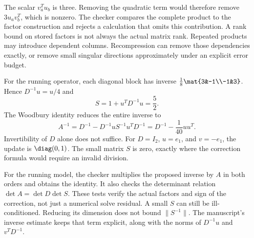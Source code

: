 The scalar $v_a^Tu_b$ is three. Removing the quadratic term would therefore remove $3u_av_b^T$, which is nonzero. The checker compares the complete product to the factor construction and rejects a calculation that omits this contribution.
A rank bound on stored factors is not always the actual matrix rank. Repeated products may introduce dependent columns. Recompression can remove those dependencies exactly, or remove small singular directions approximately under an explicit error budget.

For the running operator, each diagonal block has inverse $\frac18\mat{3&-1\\-1&3}$. Hence $D^{-1}u=u/4$ and
\[
S=1+u^TD^{-1}u=\frac52.
\]
The Woodbury identity reduces the entire inverse to
\[
A^{-1}=D^{-1}-D^{-1}uS^{-1}u^TD^{-1}
=D^{-1}-\frac1{40}uu^T.
\]
Invertibility of $D$ alone does not suffice. For $D=I_2$, $u=e_1$, and $v=-e_1$, the update is $\diag(0,1)$. The small matrix $S$ is zero, exactly where the correction formula would require an invalid division.

For the running model, the checker multiplies the proposed inverse by $A$ in both orders and obtains the identity. It also checks the determinant relation $\det A=\det D\det S$. These tests verify the actual factors and sign of the correction, not just a numerical solve residual.
A small $S$ can still be ill-conditioned. Reducing its dimension does not bound $\|S^{-1}\|$. The manuscript's inverse estimate keeps that term explicit, along with the norms of $D^{-1}u$ and $v^TD^{-1}$.


